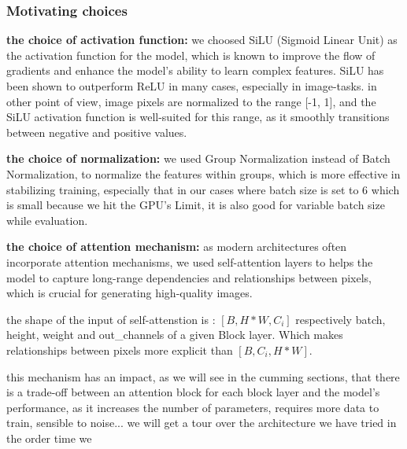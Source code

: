 \documentclass[twocolumn,superscriptaddress,aps]{revtex4-1}
\begin{document}
\subsubsection{Motivating choices}

\textbf{the choice of activation function:} we choosed SiLU (Sigmoid Linear Unit) as the activation function for the model, which is known to improve the flow of gradients and enhance the model's ability to learn complex features. SiLU has been shown to outperform ReLU in many cases, especially in image-tasks.
in other point of view, image pixels are normalized to the range [-1, 1], and the SiLU activation function is well-suited for this range, as it smoothly transitions between negative and positive values.

\textbf{the choice of normalization:} we used Group Normalization instead of Batch Normalization, to normalize the features within groups, which is more effective in stabilizing training, especially that in our cases where batch size is set to 6 which is small because we hit the GPU's Limit, it is also good for variable batch size while evaluation.

\textbf{the choice of attention mechanism:} as modern architectures often incorporate attention mechanisms, we used self-attention layers to helps the model to capture long-range dependencies and relationships between pixels, which is crucial for generating high-quality images.

the shape of the input of self-attenstion is : $[B, H*W, C_i]$ 
respectively batch, height, weight and out\_channels of a given Block layer. Which makes relationships between pixels more explicit than $[B, C_i, H*W]$.

this mechanism has an impact, as we will see in the cumming sections, that there is a trade-off between an attention block for each block layer and the model's performance, as it increases the number of parameters, requires more data to train, sensible to noise...
we will get a tour over the architecture we have tried in the order time we
\end{document}
